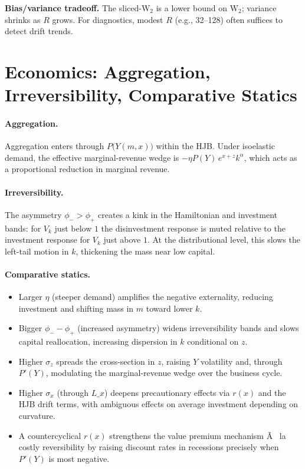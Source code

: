 \documentclass[11pt,letterpaper,oneside]{article}
\numberwithin{equation}{section}
\newcommand{\1}{\mathbf{1}}
\newcommand{\Lx}{L\_x}
\begin{document}
\begin{tcolorbox}[mathstyle]
\textbf{Bias/variance tradeoff.} The sliced-$\mathrm W_2$ is a lower bound on $\mathrm W_2$; variance shrinks as $R$ grows. For diagnostics, modest $R$ (e.g., 32--128) often suffices to detect drift trends.
\end{tcolorbox}

\section{Economics: Aggregation, Irreversibility, Comparative Statics}

\paragraph{Aggregation.}
Aggregation enters through $P\big(Y(m,x)\big)$ within the HJB. Under isoelastic demand, the effective marginal-revenue wedge is $-\eta P(Y)\,e^{x+z}k^\alpha$, which acts as a proportional reduction in marginal revenue.

\paragraph{Irreversibility.}
The asymmetry $\phi_->\phi_+$ creates a kink in the Hamiltonian and investment bands: for $V_k$ just below $1$ the disinvestment response is muted relative to the investment response for $V_k$ just above $1$. At the distributional level, this slows the left-tail motion in $k$, thickening the mass near low capital.

\paragraph{Comparative statics.}
\begin{itemize}[leftmargin=1.25em]
\item Larger $\eta$ (steeper demand) amplifies the negative externality, reducing investment and shifting mass in $m$ toward lower $k$.
\item Bigger $\phi_- - \phi_+$ (increased asymmetry) widens irreversibility bands and slows capital reallocation, increasing dispersion in $k$ conditional on $z$.
\item Higher $\sigma_z$ spreads the cross-section in $z$, raising $Y$ volatility and, through $P'(Y)$, modulating the marginal-revenue wedge over the business cycle.
\item Higher $\sigma_x$ (through $\Lx$) deepens precautionary effects via $r(x)$ and the HJB drift terms, with ambiguous effects on average investment depending on curvature.
\item A countercyclical $r(x)$ strengthens the value premium mechanism Ã  la costly reversibility by raising discount rates in recessions precisely when $P'(Y)$ is most negative.
\end{itemize}
\end{document}
